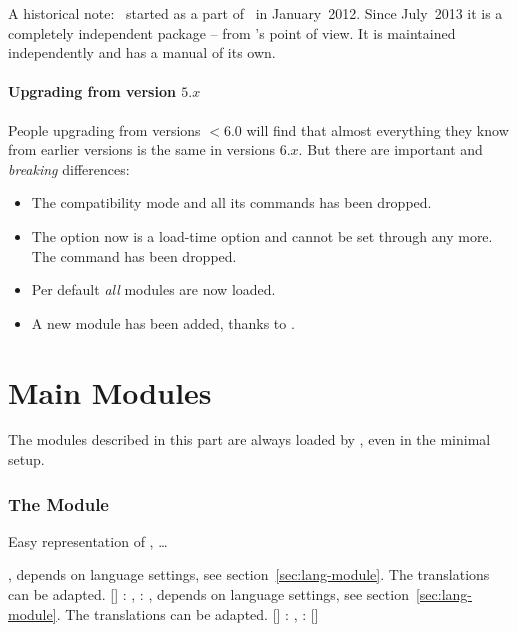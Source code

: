 \documentclass{chemmacros-manual}
\begin{document}
A historical note: \chemformula\ started as a part of \chemmacros\ in
January~2012.  Since July~2013 it is a completely independent package -- from
\chemformula's point of view.  It is maintained independently and has a manual
of its own.

\subsection{Upgrading from version $5.x$}
People upgrading from versions $<6.0$ will find that almost everything they
know from earlier versions is the same in versions $6.x$.  But there are
important and \emph{breaking} differences:
\begin{itemize}
  \item The compatibility mode and all its commands has been dropped.
  \item The option  now is a load-time option and cannot be
    set through  any more.  The command  has
    been dropped.
  \item Per default \emph{all} modules are now loaded.
  \item A new module  has been added, thanks to \leandriis.
\end{itemize}

\part{Main Modules}\label{part:main-modules}

The modules described in this part are always loaded by \chemmacros, even in
the minimal setup.

\section{The  Module}\label{sec:acid-base-module}

Easy representation of \pH, \pKa \ldots
\begin{commands}
   \pH
   \pOH
   \Ka, depends on language settings, see
    section~\vref{sec:lang-module}.  The translations can be adapted.
   \Kb
   \Kw
  [] : \pKa, : \pKa[1], depends
    on language settings, see  section~\vref{sec:lang-module}.  The translations
    can be adapted.
  [] : \pKb, : \pKb[1]
  [] \eg\  \p{\Kw}
\end{commands}
\end{document}
